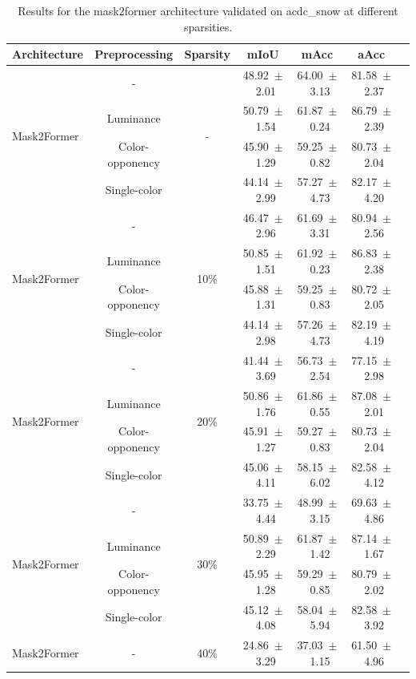\begin{table}[h]
\centering
\caption{Results for the mask2former architecture validated on acdc_snow at different sparsities.}
\begin{tabular}{@{}lccc ccc@{}}
\toprule
Architecture & Preprocessing & Sparsity & mIoU & mAcc & aAcc \\
\midrule

\multirow{4}{*}{Mask2Former} & - & \multirow{4}{*}{-} & 48.92~$\pm$~2.01 & 64.00~$\pm$~3.13 & 81.58~$\pm$~2.37 \\
& Luminance & & 50.79~$\pm$~1.54 & 61.87~$\pm$~0.24 & 86.79~$\pm$~2.39 \\
& Color-opponency & & 45.90~$\pm$~1.29 & 59.25~$\pm$~0.82 & 80.73~$\pm$~2.04 \\
& Single-color & & 44.14~$\pm$~2.99 & 57.27~$\pm$~4.73 & 82.17~$\pm$~4.20 \\
\midrule
\multirow{4}{*}{Mask2Former} & - & \multirow{4}{*}{10\%} & 46.47~$\pm$~2.96 & 61.69~$\pm$~3.31 & 80.94~$\pm$~2.56 \\
& Luminance & & 50.85~$\pm$~1.51 & 61.92~$\pm$~0.23 & 86.83~$\pm$~2.38 \\
& Color-opponency & & 45.88~$\pm$~1.31 & 59.25~$\pm$~0.83 & 80.72~$\pm$~2.05 \\
& Single-color & & 44.14~$\pm$~2.98 & 57.26~$\pm$~4.73 & 82.19~$\pm$~4.19 \\
\midrule
\multirow{4}{*}{Mask2Former} & - & \multirow{4}{*}{20\%} & 41.44~$\pm$~3.69 & 56.73~$\pm$~2.54 & 77.15~$\pm$~2.98 \\
& Luminance & & 50.86~$\pm$~1.76 & 61.86~$\pm$~0.55 & 87.08~$\pm$~2.01 \\
& Color-opponency & & 45.91~$\pm$~1.27 & 59.27~$\pm$~0.83 & 80.73~$\pm$~2.04 \\
& Single-color & & 45.06~$\pm$~4.11 & 58.15~$\pm$~6.02 & 82.58~$\pm$~4.12 \\
\midrule
\multirow{4}{*}{Mask2Former} & - & \multirow{4}{*}{30\%} & 33.75~$\pm$~4.44 & 48.99~$\pm$~3.15 & 69.63~$\pm$~4.86 \\
& Luminance & & 50.89~$\pm$~2.29 & 61.87~$\pm$~1.42 & 87.14~$\pm$~1.67 \\
& Color-opponency & & 45.95~$\pm$~1.28 & 59.29~$\pm$~0.85 & 80.79~$\pm$~2.02 \\
& Single-color & & 45.12~$\pm$~4.08 & 58.04~$\pm$~5.94 & 82.58~$\pm$~3.92 \\
\midrule
\multirow{4}{*}{Mask2Former} & - & \multirow{4}{*}{40\%} & 24.86~$\pm$~3.29 & 37.03~$\pm$~1.15 & 61.50~$\pm$~4.96 \\

\end{tabular}
\end{table}
